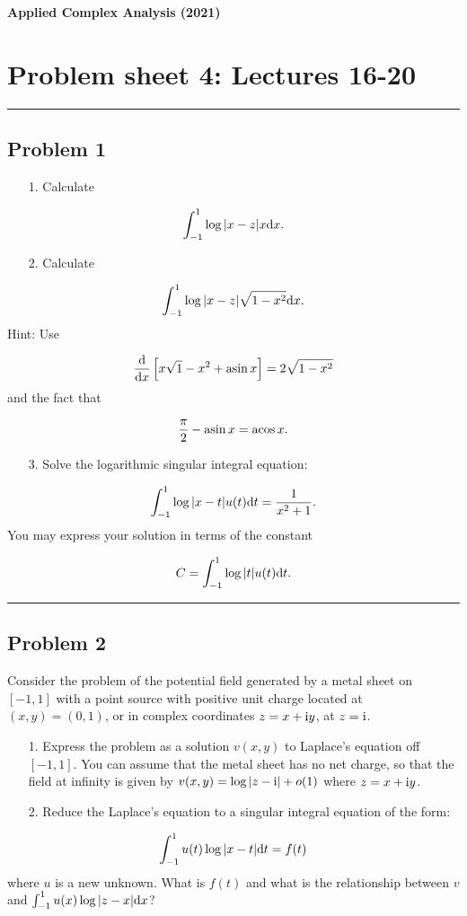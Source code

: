 \documentclass[12pt,a4paper]{article}
\def\D{ {\rm d} }
\def\I{ {\rm i} }
\def\acos{ {\rm acos}\, }
\def\asin{ {\rm asin}\, }
\def\dx{\D x}
\def\dt{\D t}
\def\br[#1]{\left[{#1}\right]}
\def\abs#1{\left|{#1}\right|}
\begin{document}
\textbf{Applied Complex Analysis (2021)}

\section{Problem sheet 4: Lectures 16-20}
\rule{\textwidth}{1pt}
\subsection{Problem 1}
\begin{itemize}
\item[1. ] Calculate

\end{itemize}
\[
\int_{-1}^1 \log|x - z| x \dx.
\]
\begin{itemize}
\item[2. ] Calculate

\end{itemize}
\[
\int_{-1}^1 \log|x - z| \sqrt{1-x^2} \dx.
\]
Hint: Use

\[
{\D \over \dx}\br[x \sqrt{1-x^2} + \asin x] = 2 \sqrt{1-x^2}
\]
and the fact that

\[
{\pi \over 2} - \asin x = \acos x.
\]
\begin{itemize}
\item[3. ] Solve the logarithmic singular integral equation:

\end{itemize}
\[
\int_{-1}^1 \log|x-t| u(t)  \dt = {1 \over x^2 + 1}.
\]
You may express your solution in terms of the constant

\[
C = \int_{-1}^1 \log | t| u(t) \dt.
\]
\rule{\textwidth}{1pt}
\subsection{Problem 2}
Consider the problem of the potential field generated by a metal sheet on $[-1,1]$ with a point source with positive unit charge located at $(x,y) = (0,1)$, or in complex coordinates $z = x + \I y$, at $z = \I$.

\begin{itemize}
\item[1. ] Express the problem as a solution $v(x,y)$ to Laplace's equation off $[-1,1]$. You can assume that the metal sheet has no net charge, so that the field at infinity is given by $v(x,y) = \log\abs{z - \I} + o(1)$ where $z = x + \I y$.


\item[2. ] Reduce the Laplace's equation to a singular integral equation of the form:

\end{itemize}
\[
\int_{-1}^1 u(t) \log |x-t| \dt = f(t)
\]
where $u$ is a new unknown. What is $f(t)$ and what is the relationship between $v$ and $\int_{-1}^1 u(x) \log|z -x| \dx$?
\end{document}
